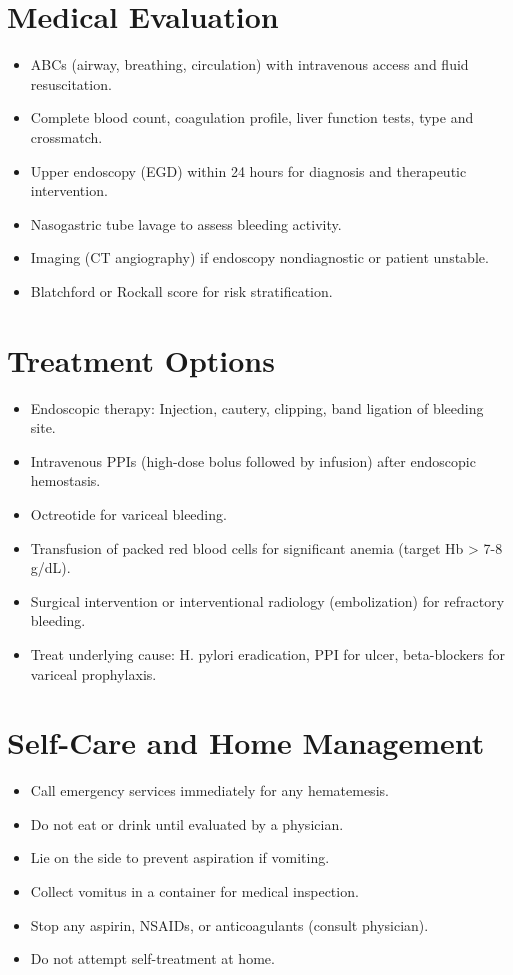 \section*{Medical Evaluation}
\begin{itemize}
  \item ABCs (airway, breathing, circulation) with intravenous access and fluid resuscitation.
  \item Complete blood count, coagulation profile, liver function tests, type and crossmatch.
  \item Upper endoscopy (EGD) within 24 hours for diagnosis and therapeutic intervention.
  \item Nasogastric tube lavage to assess bleeding activity.
  \item Imaging (CT angiography) if endoscopy nondiagnostic or patient unstable.
  \item Blatchford or Rockall score for risk stratification.
\end{itemize}

\section*{Treatment Options}
\begin{itemize}
  \item Endoscopic therapy: Injection, cautery, clipping, band ligation of bleeding site.
  \item Intravenous PPIs (high-dose bolus followed by infusion) after endoscopic hemostasis.
  \item Octreotide for variceal bleeding.
  \item Transfusion of packed red blood cells for significant anemia (target Hb > 7-8 g/dL).
  \item Surgical intervention or interventional radiology (embolization) for refractory bleeding.
  \item Treat underlying cause: H. pylori eradication, PPI for ulcer, beta-blockers for variceal prophylaxis.
\end{itemize}

\section*{Self-Care and Home Management}
\begin{itemize}
  \item Call emergency services immediately for any hematemesis.
  \item Do not eat or drink until evaluated by a physician.
  \item Lie on the side to prevent aspiration if vomiting.
  \item Collect vomitus in a container for medical inspection.
  \item Stop any aspirin, NSAIDs, or anticoagulants (consult physician).
  \item Do not attempt self-treatment at home.
\end{itemize}

